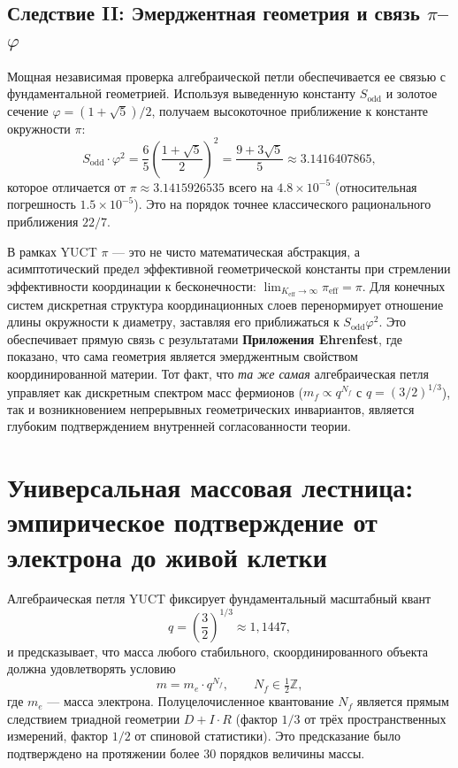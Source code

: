 \documentclass[11pt,a4paper]{article}
\begin{document}
	\subsection{Следствие II: Эмерджентная геометрия и связь \(\pi\)–\(\varphi\)}
	\label{subsec:consequence-geometry}
	
	Мощная независимая проверка алгебраической петли обеспечивается ее связью с фундаментальной геометрией. Используя выведенную константу \(S_{\mathrm{odd}}\) и золотое сечение \(\varphi = (1+\sqrt{5})/2\), получаем высокоточное приближение к константе окружности \(\pi\):
	\[
	S_{\mathrm{odd}} \cdot \varphi^2 = \frac{6}{5} \left( \frac{1+\sqrt{5}}{2} \right)^2 = \frac{9+3\sqrt{5}}{5} \approx 3.1416407865,
	\]
	которое отличается от \(\pi \approx 3.1415926535\) всего на \(4.8 \times 10^{-5}\) (относительная погрешность \(1.5 \times 10^{-5}\)). Это на порядок точнее классического рационального приближения \(22/7\).
	
	В рамках YUCT \(\pi\) — это не чисто математическая абстракция, а асимптотический предел эффективной геометрической константы при стремлении эффективности координации к бесконечности: \(\lim_{K_{\mathrm{eff}} \to \infty} \pi_{\mathrm{eff}} = \pi\). Для конечных систем дискретная структура координационных слоев перенормирует отношение длины окружности к диаметру, заставляя его приближаться к \(S_{\mathrm{odd}}\varphi^2\). Это обеспечивает прямую связь с результатами \textbf{Приложения Ehrenfest}, где показано, что сама геометрия является эмерджентным свойством координированной материи. Тот факт, что \emph{та же самая} алгебраическая петля управляет как дискретным спектром масс фермионов (\(m_f \propto q^{N_f}\) с \(q = (3/2)^{1/3}\)), так и возникновением непрерывных геометрических инвариантов, является глубоким подтверждением внутренней согласованности теории.
	
	
\section{Универсальная массовая лестница: эмпирическое подтверждение от электрона до живой клетки}
\label{sec:mass_ladder}

Алгебраическая петля YUCT фиксирует фундаментальный масштабный квант
\begin{equation}
	q = \left(\frac{3}{2}\right)^{1/3} \approx 1{,}1447,
\end{equation}
и предсказывает, что масса любого стабильного, скоординированного объекта должна удовлетворять условию
\begin{equation}
	m = m_e \cdot q^{N_f}, \qquad N_f \in \tfrac{1}{2}\mathbb{Z},
\end{equation}
где $m_e$ — масса электрона. Полуцелочисленное квантование $N_f$ является прямым следствием триадной геометрии $D+I\cdot R$ (фактор $1/3$ от трёх пространственных измерений, фактор $1/2$ от спиновой статистики). Это предсказание было подтверждено на протяжении более 30 порядков величины массы.
\end{document}
